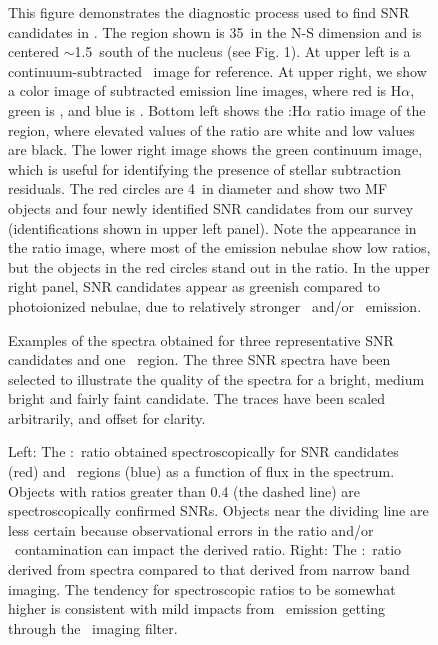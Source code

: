 \begin{figure}
\caption{This figure demonstrates the diagnostic process used to find SNR candidates in \gal.  The region shown is 35\arcsec\ in the N-S dimension and is centered $\sim$1.5\arcmin\ south of the nucleus (see Fig. 1).  At upper left is a continuum-subtracted \sii\ image for reference.  At upper right, we show a color image of subtracted emission line images, where red is H$\alpha$, green is \sii, and blue is \oiii.  Bottom left shows the \sii:H$\alpha$ ratio image of the region, where elevated values of the  ratio are white and low values are black.  The lower right image shows the green continuum image, which is useful for identifying the presence of stellar subtraction residuals.  The red circles are 4\arcsec\ in diameter and show two MF objects and four newly identified SNR candidates from our survey (identifications shown in upper left panel).  Note the appearance in the ratio image, where most of the emission nebulae show low ratios, but the objects in the red circles stand out in the ratio.  In the upper right panel, SNR candidates appear as greenish compared to photoionized nebulae, due to relatively stronger \sii\ and/or \oiii\ emission. \label{fig_diagnostic}}
\end{figure}

\begin{figure}
\caption{Examples of the spectra obtained for three representative SNR candidates and one \hii\ region.  The three SNR spectra have been selected to illustrate the quality of the spectra for a bright, medium bright and fairly faint candidate. The traces have been scaled arbitrarily, and offset for clarity. \label{fig_example_spectra}}
\end{figure}

\begin{figure}

\caption{Left: The \sii:\ha\ ratio obtained spectroscopically for SNR candidates (red) and \hii\ regions (blue) as a function of \ha flux in the spectrum.  Objects with ratios greater than 0.4 (the dashed line) are spectroscopically confirmed SNRs.  Objects near the dividing line are less certain because observational errors in the ratio and/or \hii\ contamination can impact the derived ratio. Right: The \sii:\ha\ ratio derived from spectra compared to that derived from narrow band imaging.  The tendency for spectroscopic ratios to be somewhat higher is consistent with mild impacts from \nii\ emission getting through the \ha\ imaging filter.  \label{fig_s2_ha}}

\end{figure}


